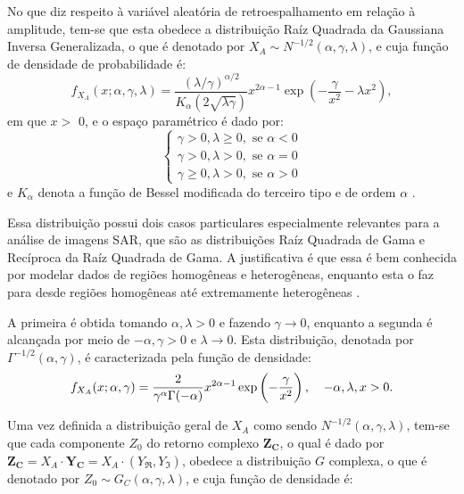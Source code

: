 \documentclass[12pt]{article}
\begin{document}
No que diz respeito à variável aleatória de retroespalhamento em relação à amplitude, tem-se que esta obedece a distribuição Raíz Quadrada da Gaussiana Inversa Generalizada, o que é denotado por $X_A \sim N^{-1/2}(\alpha, \gamma, \lambda)$, e cuja função de densidade de probabilidade é:
\begin{displaymath}
    f_{X_A}(x; \alpha, \gamma, \lambda) = \frac{(\lambda/\gamma)^{\alpha/2}}{K_{\alpha}(2\sqrt{\lambda\gamma})} x^{2\alpha - 1} \exp\left( -\frac{\gamma}{x^2} - \lambda x^2 \right),
\end{displaymath}
em que $x >$ 0, e o espaço paramétrico é dado por:
\[
\begin{cases}
    \gamma > 0, \lambda \geq 0,\text{ se }\alpha < 0 \\
    \gamma > 0, \lambda > 0,\text{ se }\alpha = 0 \\
    \gamma \geq 0, \lambda > 0,\text{ se }\alpha > 0
\end{cases}
\]
e $K_\alpha$ denota a função de Bessel modificada do terceiro tipo e de ordem $\alpha$ \cite{frery97}.

Essa distribuição possui dois casos particulares especialmente relevantes para a análise de imagens SAR, que são as distribuições Raíz Quadrada de Gama e Recíproca da Raíz Quadrada de Gama. A justificativa é  que essa é bem conhecida por modelar dados de regiões homogêneas e heterogêneas, enquanto esta o faz para desde regiões homogêneas até extremamente heterogêneas \cite{frery97}.

A primeira é obtida tomando $\alpha, \lambda > 0$ e fazendo $\gamma \rightarrow 0$, enquanto a segunda é alcançada por meio de $-\alpha, \gamma > 0$ e $\lambda \rightarrow 0$. Esta distribuição, denotada por $\Gamma^{-1/2}(\alpha, \gamma)$, é caracterizada pela função de densidade:
\begin{displaymath}
    f_{X_A}(x; \alpha, \gamma) = \frac{2}{\gamma^{\alpha} \Gamma(-\alpha)} x^{2\alpha - 1} \exp\left(-\frac{\gamma}{x^2}\right), \hspace{0.03\linewidth} -\alpha, \lambda, x > 0.
\end{displaymath}

Uma vez definida a distribuição geral de $X_A$ como sendo $N^{-1/2}(\alpha, \gamma, \lambda)$, tem-se que cada componente $Z_0$ do retorno complexo $\mathbf{Z_C}$, o qual é dado por $\mathbf{Z_C} = X_A \cdot \mathbf{Y_C} = X_A \cdot (Y_{\Re}, Y_{\Im})$, obedece a distribuição $G$ complexa, o que é denotado por $Z_0 \sim G_C(\alpha, \gamma, \lambda)$, e cuja função de densidade é:
\end{document}
